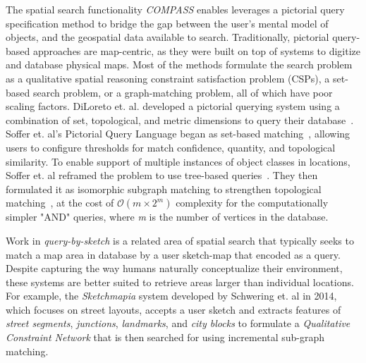 \par{The spatial search functionality \emph{COMPASS} enables leverages a pictorial query specification method to bridge the gap between the user's mental model of objects, and the geospatial data available to search. 
Traditionally, pictorial query-based approaches are map-centric, as they were built on top of systems to digitize and database physical maps\cite{Samet1996,Samet1998}.
Most of the methods formulate the search problem as a qualitative spatial reasoning constraint satisfaction problem (CSPs), a set-based search problem, or a graph-matching problem, all of which have poor scaling factors.
DiLoreto et. al. developed a pictorial querying system using a combination of set, topological, and metric dimensions to query their database~\cite{DiLoreto1996}.
Soffer et. al's Pictorial Query Language began as set-based matching~\cite{Soffer1997, Soffer1998a}, allowing users to configure thresholds for match confidence, quantity, and topological similarity.
To enable support of multiple instances of object classes in locations, Soffer et. al reframed the problem to use tree-based queries~\cite{Soffer1999}.
They then formulated it as isomorphic subgraph matching to strengthen topological matching~\cite{Folkers2000}, at the cost of $\mathcal{O}(m\times 2^m)$ complexity for the computationally simpler "AND" queries, where \textit{m} is the number of vertices in the database. 

Work in \textit{query-by-sketch} is a related area of spatial search that typically seeks to match a map area in database by a user sketch-map that encoded as a query. 
Despite capturing the way humans naturally conceptualize their environment, these systems are better suited to retrieve areas larger than individual locations.
For example, the \textit{Sketchmapia} system developed by Schwering et. al in 2014, which focuses on street layouts, accepts a user sketch and extracts features of \textit{street segments}, \textit{junctions}, \textit{landmarks}, and \textit{city blocks} to formulate a \textit{Qualitative Constraint Network} that is then searched for using incremental sub-graph matching.
}


